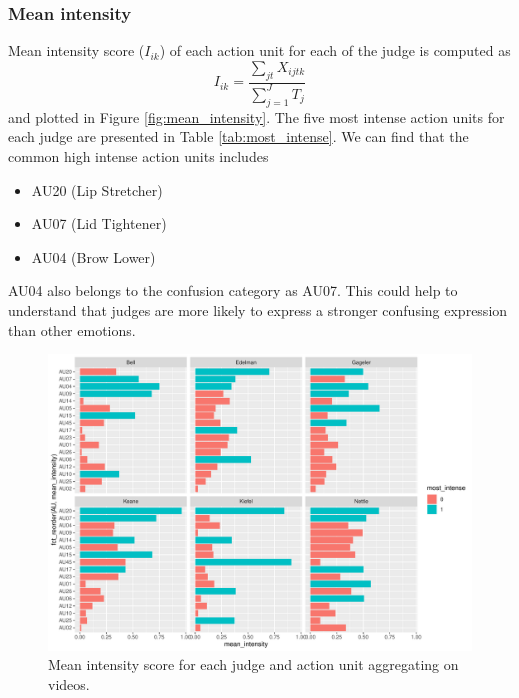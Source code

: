 \documentclass{monashthesis}
\begin{document}
\hypertarget{mean-intensity}{%
\subsubsection{Mean intensity}\label{mean-intensity}}

Mean intensity score (\(I_{ik}\)) of each action unit for each of the judge is computed as \[I_{ik} = \frac{\sum_{jt}X_{ijtk}}{\sum_{j = 1}^JT_j}\] and plotted in Figure \ref{fig:mean_intensity}. The five most intense action units for each judge are presented in Table \ref{tab:most_intense}. We can find that the common high intense action units includes

\begin{itemize}
\tightlist
\item
  AU20 (Lip Stretcher)
\item
  AU07 (Lid Tightener)
\item
  AU04 (Brow Lower)
\end{itemize}

AU04 also belongs to the confusion category as AU07. This could help to understand that judges are more likely to express a stronger confusing expression than other emotions.

\begin{figure}

{\centering \includegraphics[width=1\linewidth]{figures/mean-intensity-1} 

}

\caption{Mean intensity score for each judge and action unit aggregating on videos.\label{fig:mean_intensity}}\label{fig:mean-intensity}
\end{figure}
\end{document}
